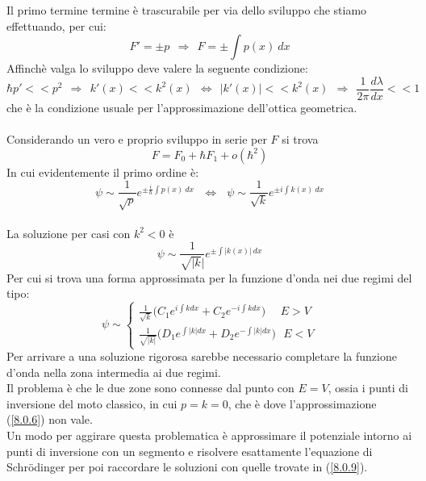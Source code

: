 \documentclass[twoside]{article}
\begin{document}
Il primo termine termine è trascurabile per via dello sviluppo che stiamo effettuando, per cui:
\begin{equation}
    F'=\pm p \ \ \Rightarrow \ \ F=\pm\int p(x) \ dx
\end{equation}
Affinchè valga lo sviluppo deve valere la seguente condizione:
\begin{equation} \label{8.0.6}
    \hbar p' << p^2 \ \ \Rightarrow \ \ k'(x)<<k^2(x) \ \ \iff \ \ |k'(x)| << k^2(x) \ \ \Rightarrow \ \ \frac{1}{2\pi}\frac{d\lambda}{dx} << 1
\end{equation}
che è la condizione usuale per l'approssimazione dell'ottica geometrica.
\\ \\
Considerando un vero e proprio sviluppo in serie per $F$ si trova
\begin{equation*}
    F=F_0 + \hbar F_1 + o(\hbar^2)
\end{equation*}
In cui evidentemente il primo ordine è:
\begin{equation}
    \psi\sim \frac{1}{\sqrt{p}}e^{\pm\frac{i}{\hbar}\int p(x) \ dx} \ \ \ \iff \ \ \  \psi\sim \frac{1}{\sqrt{k}}e^{\pm i \int k(x) \ dx}
\end{equation}
\\
La soluzione per casi con $k^2 < 0$ è
\begin{equation}
    \psi\sim \frac{1}{\sqrt{|k}|}e^{\pm \int |k(x)| \ dx}
\end{equation}
Per cui si trova una forma approssimata per la funzione d'onda nei due regimi del tipo:
\begin{equation} \label{8.0.9}
    \psi\sim \left \{ \begin{array}{rl}
         \frac{1}{\sqrt{k}}\biggl( C_1 e^{i\int k dx} + C_2 e^{-i\int k dx} \biggr) \ \ \ \ \ \ E > V  \\
         \frac{1}{\sqrt{|k|}}\biggl( D_1 e^{\int |k| dx} + D_2 e^{-\int |k| dx} \biggr) \ \ \ E < V
    \end{array}
    \right.
\end{equation}
Per arrivare a una soluzione rigorosa sarebbe necessario completare la funzione d'onda nella zona intermedia ai due regimi.
\\
Il problema è che le due zone sono connesse dal punto con $E=V$, ossia i punti di inversione del moto classico, in cui $p=k=0$, che è dove l'approssimazione (\ref{8.0.6}) non vale.
\\
Un modo per aggirare questa problematica è approssimare il potenziale intorno ai punti di inversione con un segmento e risolvere esattamente l'equazione di Schr\"odinger per poi raccordare le soluzioni con quelle trovate in (\ref{8.0.9}).
\end{document}
